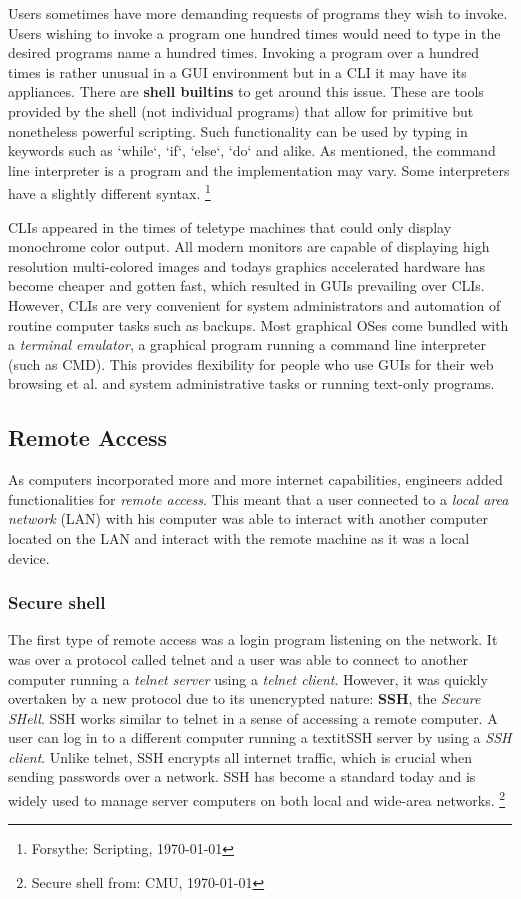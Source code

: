 Users sometimes have more demanding requests of programs they wish to invoke. Users wishing to invoke a
program one hundred times would need to type in the desired programs name a hundred times. Invoking
a program over a hundred times is rather unusual in a GUI environment but in a CLI it may have its
appliances. There are \textbf{shell builtins} to get around this issue. These are tools provided by the shell
(not individual programs) that allow for primitive but nonetheless powerful scripting. Such functionality
can be used by typing in keywords such as `while`, `if`, `else`, `do` and alike. As mentioned,
the command line interpreter is a program and the implementation may vary. Some interpreters have a
slightly different syntax. \footnote{Forsythe: Scripting, \today }



CLIs appeared in the times of teletype machines that could only display monochrome color output. All
modern monitors are capable of displaying high resolution multi-colored images and todays graphics
accelerated hardware has become cheaper and gotten fast, which resulted in GUIs prevailing over
CLIs. However, CLIs are very convenient for system administrators and automation of routine computer
tasks such as backups. Most graphical OSes come bundled with a \textit{terminal emulator}, a graphical program
running a command line interpreter (such as CMD). This provides flexibility for people who use GUIs for their web
browsing et al. and system administrative tasks or running text-only programs.


\subsection{Remote Access}

As computers incorporated more and more internet capabilities, engineers added functionalities for
\textit{remote access}. This meant that a user connected to a \textit{local area network} (LAN) with his computer
was able to interact with another computer located on the LAN and interact with the remote machine
as it was a local device. 

\subsubsection{Secure shell}

The first type of remote access was a login program listening on the network. It was over a protocol called
telnet and a user was able to connect to another computer running a \textit{telnet server} using a \textit{telnet client}.
However, it was quickly overtaken by a new protocol due to its unencrypted nature: \textbf{SSH}, the \textit{Secure SHell}.
SSH works similar to telnet in a sense of accessing a remote computer. A user can log in to a different
computer running a textit{SSH server} by using a \textit{SSH client}. Unlike telnet, SSH encrypts all internet traffic,
which is crucial when sending passwords over a network. SSH has become a standard today and is widely used to
manage server computers on both local and wide-area networks. \footnote{Secure shell from: CMU, \today }


